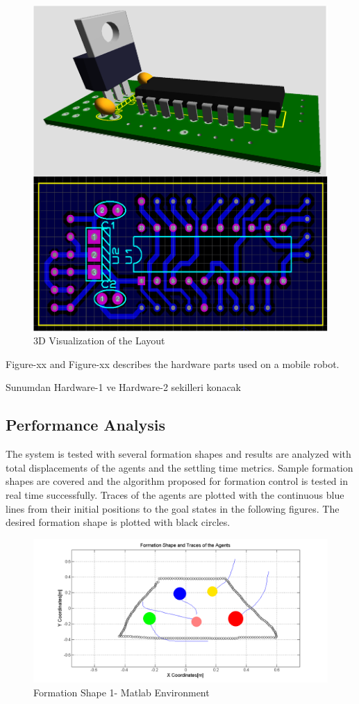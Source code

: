 \documentclass[twoside]{article}
\begin{document}
	\begin{figure}[H]
		\caption{3D Visualization of the Layout}
		\centerline{\includegraphics[scale = 0.60]{sematik-layout}}
	\end{figure} 
Figure-xx and Figure-xx describes the hardware parts used on a mobile robot.
		
		Sunumdan Hardware-1 ve Hardware-2 sekilleri konacak
		
		\subsection{Performance Analysis}
		The system is tested with several formation shapes and results are analyzed with total displacements of the agents and the settling time metrics. Sample formation shapes are covered  and the algorithm proposed for formation control is tested in real time successfully.  Traces of the agents are plotted with the continuous blue lines from their initial positions to the goal states in the following figures. The desired formation shape is plotted with black circles. 
		
		
			\begin{figure}[H]
				\caption{Formation Shape 1- Matlab Environment}
				\centerline{\includegraphics[scale = 0.45]{2_hardware}}
			\end{figure} 
			
\end{document}

